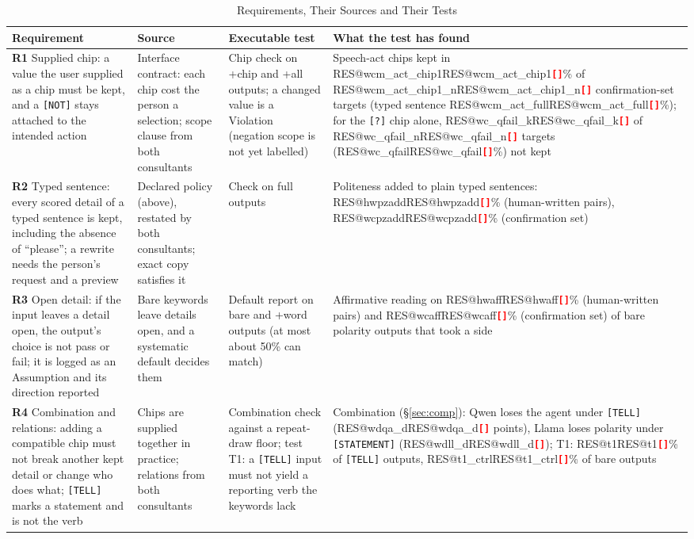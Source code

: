 \documentclass[conference,10pt]{IEEEtran}
\makeatletter
\newcommand{\RES}[1]{\ifcsname RES@#1\endcsname\csname RES@#1\endcsname\else\RESmissing{#1}\fi}
\newcommand{\RESmissing}[1]{\textcolor{red}{\textbf{\texttt{[\detokenize{#1}]}}}}
\newcommand{\pct}[1]{\RES{#1}\%}
\newcommand{\chip}[1]{\texttt{[#1]}}
\newcommand{\say}[1]{``#1''}
\makeatother
\begin{document}
\begin{table}[t]
  \caption{Requirements, Their Sources and Their Tests}
  \label{tab:trace}
  \footnotesize
  \begin{tabularx}{\textwidth}{@{}>{\raggedright\arraybackslash}p{3.45cm}>{\raggedright\arraybackslash}p{2.9cm}>{\raggedright\arraybackslash}p{3.5cm}>{\raggedright\arraybackslash}X@{}}
    \toprule
    Requirement & Source & Executable test & What the test has found\\
    \midrule
    \textbf{R1} Supplied chip: a value the user supplied as a chip must be kept, and a \chip{NOT} stays attached to the intended action &
    Interface contract: each chip cost the person a selection; scope clause from both consultants &
    Chip check on +chip and +all outputs; a changed value is a Violation (negation scope is not yet labelled) &
    Speech-act chips kept in \pct{wcm_act_chip1} of \RES{wcm_act_chip1_n} confirmation-set targets (typed sentence \pct{wcm_act_full}); for the \chip{?} chip alone, \RES{wc_qfail_k} of \RES{wc_qfail_n} targets (\pct{wc_qfail}) not kept\\
    \addlinespace
    \textbf{R2} Typed sentence: every scored detail of a typed sentence is kept, including the absence of \say{please}; a rewrite needs the person's request and a preview &
    Declared policy (above), restated by both consultants; exact copy satisfies it &
    Check on full outputs &
    Politeness added to plain typed sentences: \pct{hwpzadd} (human-written pairs), \pct{wcpzadd} (confirmation set)\\
    \addlinespace
    \textbf{R3} Open detail: if the input leaves a detail open, the output's choice is not pass or fail; it is logged as an Assumption and its direction reported &
    Bare keywords leave details open, and a systematic default decides them &
    Default report on bare and +word outputs (at most about 50\% can match) &
    Affirmative reading on \pct{hwaff} (human-written pairs) and \pct{wcaff} (confirmation set) of bare polarity outputs that took a side\\
    \addlinespace
    \textbf{R4} Combination and relations: adding a compatible chip must not break another kept detail or change who does what; \chip{TELL} marks a statement and is not the verb &
    Chips are supplied together in practice; relations from both consultants &
    Combination check against a repeat-draw floor; test T1: a \chip{TELL} input must not yield a reporting verb the keywords lack &
    Combination (\S\ref{sec:comp}): Qwen loses the agent under \chip{TELL} (\RES{wdqa_d} points), Llama loses polarity under \chip{STATEMENT} (\RES{wdll_d}); T1: \pct{t1} of \chip{TELL} outputs, \pct{t1_ctrl} of bare outputs\\

\end{tabularx}
\end{table}
\end{document}
